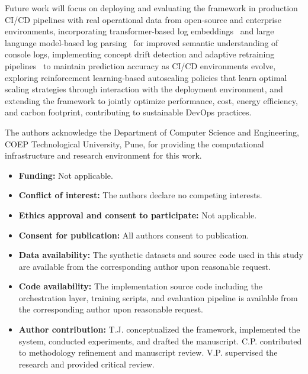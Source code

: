 \documentclass[sn-nature]{sn-jnl}
\theoremstyle{thmstyleone}
\theoremstyle{thmstyletwo}
\theoremstyle{thmstylethree}
\begin{document}
Future work will focus on deploying and evaluating the framework in production CI/CD pipelines with real operational data from open-source and enterprise environments, incorporating transformer-based log embeddings~\cite{liao2025logtransformer, devlin2019bert} and large language model-based log parsing~\cite{zhou2024logllm} for improved semantic understanding of console logs, implementing concept drift detection and adaptive retraining pipelines~\cite{bayram2025trustworthy, abdullahi2025conceptdrift} to maintain prediction accuracy as CI/CD environments evolve, exploring reinforcement learning-based autoscaling policies that learn optimal scaling strategies through interaction with the deployment environment, and extending the framework to jointly optimize performance, cost, energy efficiency, and carbon footprint, contributing to sustainable DevOps practices.

\backmatter


The authors acknowledge the Department of Computer Science and Engineering, COEP Technological University, Pune, for providing the computational infrastructure and research environment for this work.


\begin{itemize}
\item \textbf{Funding:} Not applicable.
\item \textbf{Conflict of interest:} The authors declare no competing interests.
\item \textbf{Ethics approval and consent to participate:} Not applicable.
\item \textbf{Consent for publication:} All authors consent to publication.
\item \textbf{Data availability:} The synthetic datasets and source code used in this study are available from the corresponding author upon reasonable request.
\item \textbf{Code availability:} The implementation source code including the orchestration layer, training scripts, and evaluation pipeline is available from the corresponding author upon reasonable request.
\item \textbf{Author contribution:} T.J. conceptualized the framework, implemented the system, conducted experiments, and drafted the manuscript. C.P. contributed to methodology refinement and manuscript review. V.P. supervised the research and provided critical review.
\end{itemize}



\end{document}
